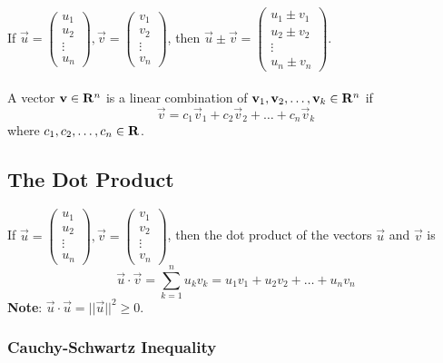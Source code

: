 \documentclass{article}
\begin{document}
	If $ \vec{u} = \begin{pmatrix} u_1 \\ u_2 \\ \vdots \\ u_n \end{pmatrix}, \vec{v} = \begin{pmatrix} v_1 \\ v_2 \\ \vdots \\ v_n \end{pmatrix} $, then $ \vec{u} \pm \vec{v} = \begin{pmatrix} u_1 \pm v_1 \\ u_2 \pm v_2 \\ \vdots \\ u_n \pm v_n \end{pmatrix} $. \\ \\
	
	A vector $ \mathbf{v} \in \mathbf{R}^n $ is a linear combination of $ \mathbf{v}_1, \mathbf{v}_2, \dots, \mathbf{v}_k \in \mathbf{R}^n $ if
	\[
		\vec{v} = c_1 \vec{v}_1 + c_2 \vec{v}_2 + \dots + c_n \vec{v}_k
	\]
	where $ c_1,c_2,\dots,c_n \in \mathbf{R} $.
	
\subsection{The Dot Product}

	If $ \vec{u} = \begin{pmatrix} u_1 \\ u_2 \\ \vdots \\ u_n \end{pmatrix}, \vec{v} = \begin{pmatrix} v_1 \\ v_2 \\ \vdots \\ v_n \end{pmatrix} $, then the dot product of the vectors $ \vec{u} $ and $ \vec{v} $ is
	\[
		\vec{u} \cdot \vec{v} = \sum\limits_{k=1}^{n} u_k v_k = u_1v_1 + u_2v_2 + \dots + u_nv_n
	\]
	\textbf{Note}: $ \vec{u} \cdot \vec{u} = ||\vec{u}||^2 \geq 0 $.
	
	\subsubsection*{Cauchy-Schwartz Inequality}
	
\end{document}
